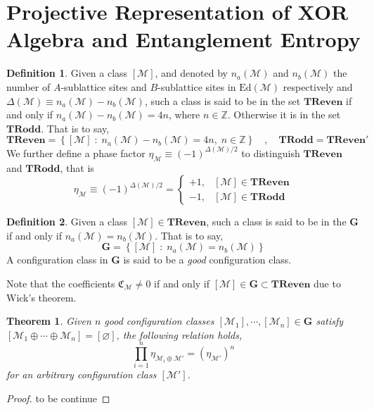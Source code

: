 \documentclass[12font]{article}
\newtheorem{theorem}{Theorem}[section]
\theoremstyle{definition}
\newtheorem{definition}{Definition}[section]
\numberwithin{equation}{section}
\newcommand{\lr}[1]{\left(  #1  \right)}
\newcommand{\lrg}[1]{\left\{  #1  \right\}}
\newcommand{\mrm}[1]{\mathrm{#1}}
\newcommand{\bo}[1]{\mathbf{#1}}
\newcommand{\alert}[1]{{\color{red}#1}}
\newcommand{\TReven}{\bo{TReven}}
\newcommand{\TRodd}{\bo{TRodd}}
\newcommand{\Good}{\bo{G}}
\begin{document}
\section{Projective Representation of XOR Algebra and Entanglement Entropy}
\begin{definition}
  Given a class $[\mathcal{M}]$, and denoted by $n_a(\mathcal{M})$ and $n_b(\mathcal{M})$  the number of $A$-sublattice sites and $B$-sublattice sites in $\mrm{Ed}\lr{\mathcal{M}}$ respectively and $\Delta(\mathcal{M}) \equiv n_a(\mathcal{M})-n_b(\mathcal{M})$, such a class is said to be in the set $\TReven$ if and only if $n_a(\mathcal{M})-n_b(\mathcal{M})=4n$, where $n\in\mathbb{Z}$. Otherwise it is in the set $\TRodd$. That is to say,
  \[
  \TReven = \lrg{[\mathcal{M}] \; :\; n_a(\mathcal{M})-n_b(\mathcal{M})=4n,\; n\in\mathbb{Z}} \quad,\quad \TRodd =  \TReven'
  \]
  We further define a phase factor $\eta_{\mathcal{M}} \equiv (-1)^{\Delta(\mathcal{M})/2}$ to distinguish $\TReven$ and $\TRodd$, that is
  \[
  \eta_\mathcal{M}\equiv (-1)^{\Delta(\mathcal{M})/2} = \begin{cases}
                       +1, & [\mathcal{M}]\in\TReven \\
                       -1, & [\mathcal{M}]\in\TRodd
                     \end{cases}
  \]
\end{definition}
\begin{definition}
  Given a class $[\mathcal{M}]\in\TReven$, such a class is said to be in the $\Good$ if and only if $n_a(\mathcal{M})=n_b(\mathcal{M})$. That is to say,
  \[
  \Good = \lrg{[\mathcal{M}] \; : \; n_a(\mathcal{M}) = n_b(\mathcal{M})}
  \]
  A configuration class in $\Good$ is said to be a \emph{good} configuration class. 
\end{definition}
Note that the coefficients $\mathfrak{C}_{\mathcal{M}}\neq 0$ if and only if $[\mathcal{M}]\in\Good\subset\TReven$ due to Wick's theorem.

\begin{theorem}
  Given $n$ good configuration classes $[\mathcal{M}_1],\cdots,[\mathcal{M}_n]\in\Good$ satisfy $[\mathcal{M}_1\oplus\cdots\oplus\mathcal{M}_n] = [\varnothing]$, the following relation holds,
  \[
  \prod_{i=1}^{n}\eta_{\mathcal{M}_i\oplus\mathcal{M}'} = (\eta_{\mathcal{M}'})^n
  \]
  for an arbitrary configuration class $[\mathcal{M}']$.
\end{theorem}
\begin{proof}
  \alert{to be continue}
\end{proof}
\end{document}
